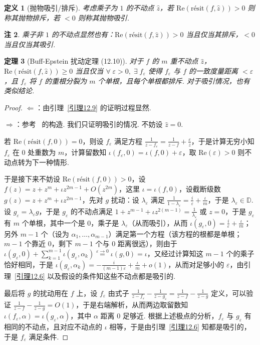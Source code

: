 \documentclass[11pt, a4paper, oneside]{ctexart}
\newtheorem{theorem}{定理}[section]
\newtheorem{definition}[theorem]{定义}
\newtheorem{remark}[theorem]{注}
\newcommand{\D}{\mathbb{D}}
\newcommand{\re}{\mathrm{Re}}
\newcommand{\ri}{\mathrm{résit}}
\begin{document}
    \begin{definition}[抛物吸引/排斥]
        考虑乘子为 $1$ 的不动点 $\hat{z}$，若 $\re(\ri(f,\hat{z}))>0$ 则称其抛物排斥，若 $<0$ 则称其抛物吸引.
    \end{definition}
    \begin{remark}
        乘子非 $1$ 的不动点显然也有：$\re(\ri(f,\hat{z}))>0$ 当且仅当其排斥，$<0$ 当且仅当其吸引.
    \end{remark}

    \begin{theorem}[Buff-Epstein 扰动定理 (12.10)]
        对于 $f$ 的 $m$ 重不动点 $\hat{z}$，$\re(\ri(f,\hat{z}))\geq 0$ 当且仅当 $\forall\; \varepsilon>0,\; \exists\; f_{\varepsilon}$ 使得 $f_{\varepsilon}$ 与 $f$ 的一致度量距离 $<\varepsilon$，且 $f_{\varepsilon}$ 将 $f$ 的重根分裂为 $m$ 个单根，且每个单根都排斥. 对于吸引情况，也有类似结论.
    \end{theorem}
    \begin{proof}
        $\Leftarrow$：由引理~\ref{引理12.9} 的证明过程显然.
        
        $\Rightarrow$：参考~\cite{buff} 的构造. 我们只证明吸引的情况. 不妨设 $\hat{z}=0$.

        若 $\re(\ri(f,0))=0$，则设 $f_{\varepsilon}$ 满足方程 $\frac{1}{z-f_{\varepsilon}}=\frac{1}{z-f}+\frac{\varepsilon}{z}$，于是计算无穷小知 $f_{\varepsilon}$ 在 $0$ 处重数为 $m$，计算留数知 $\iota(f_{\varepsilon},0)=\iota(f,0)+\varepsilon$，取 $\re(\varepsilon)>0$ 则不动点转为下一种情形.
        
        于是接下来不妨设 $\re(\ri(f,0))>0$，设 $f(z)=z+z^m+\iota z^{2m-1}+O(z^{2m})$，这里 $\iota=\iota(f,0)$，设截断级数 $g(z)=z+z^m+\iota z^{2m-1}$，先对 $g$ 扰动：设 $\lambda_{\varepsilon}$ 满足 $\frac{1}{1-\lambda_{\varepsilon}}=\frac{i}{\varepsilon}+\frac{\iota}{m}$，于是 $\lambda_{\varepsilon}\in\D$. 设 $g_{\varepsilon}=\lambda_{\varepsilon}g$，于是 $g_{\varepsilon}$ 的不动点满足 $1+z^{m-1}+\iota z^{2(m-1)}=\frac{1}{\lambda_{\varepsilon}}$ 或 $z=0$，于是 $g_{\varepsilon}$ 有 $m$ 个单根，其中一个是 $0$，乘子是 $\lambda_{\varepsilon}$（从而吸引），从而 $\iota(g_{\varepsilon},0)=\frac{i}{\varepsilon}+\frac{\iota}{m}$；另外 $m-1$ 个（设为 $\alpha_1,\ldots,\alpha_{m-1}$）满足第一个方程（该方程的根都是单根；$m-1$ 个靠近 $0$，剩下 $m-1$ 个与 $0$ 距离很远），则由于 $\iota(g_{\varepsilon},0)+\sum\limits_{k=1}^{m-1}\iota(g_{\varepsilon},\alpha_k)\stackrel{\varepsilon\to 0}{=}\iota(g,0)=\iota$，又经过计算知这 $m-1$ 个的乘子恰好相同，于是 $\iota(g_{\varepsilon},\alpha_k)=-\frac{i}{(m-1)\varepsilon}+\frac{\iota}{m}+o(1)$，从而对足够小的 $\varepsilon$，由引理~\ref{引理12.6} 以及假设的条件知这些不动点都是吸引的.

        最后将 $g$ 的扰动用在 $f$ 上，设 $f_{\varepsilon}$ 由式子 $\frac{1}{z-f_{\varepsilon}}-\frac{1}{z-g_{\varepsilon}}=\frac{1}{z-f}-\frac{1}{z-g}$ 定义，可以验证 $\frac{1}{z-f}-\frac{1}{z-g}=O(1)$，于是右端解析，从而两边取留数知 $\iota(f_{\varepsilon},\alpha)=\iota(g_{\varepsilon},\alpha)$，其中 $\alpha$ 距离 $0$ 足够近. 根据上述极点的分析，$f_{\varepsilon}$ 与 $g_{\varepsilon}$ 有相同的不动点，且对应不动点的 $\iota$ 相等，于是由引理~\ref{引理12.6} 知都是吸引的，于是 $f_{\varepsilon}$ 满足条件.
    \end{proof}
\end{document}
